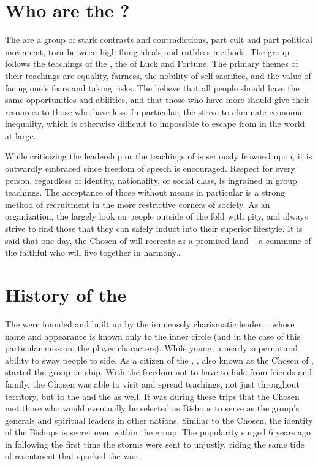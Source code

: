 \documentclass[blue]{GL2020}
\begin{document}
\name{\bCult{}}

\section*{Who are the \pGoaties{}?}
The \pGoaties{} are a group of stark contrasts and contradictions, part cult and part political movement, torn between high-flung ideals and ruthless methods. The group follows the teachings of the \cGenesis{\Deity} \cGenesis{}, the \cGenesis{\Deity} of Luck and Fortune. The primary themes of their teachings are equality, fairness, the nobility of self-sacrifice, and the value of facing one’s fears and taking risks. The \pGoaties{} believe that all people should have the same opportunities and abilities, and that those who have more should give their resources to those who have less. In particular, the \pGoaties{} strive to eliminate economic inequality, which is otherwise difficult to impossible to escape from in the world at large.

While criticizing the leadership or the teachings of \cGenesis{} is seriously frowned upon, it is outwardly embraced since freedom of speech is encouraged. Respect for every person, regardless of identity, nationality, or social class, is ingrained in group teachings. The acceptance of those without means in particular is a strong method of recruitment in the more restrictive corners of society. As an organization, the \pGoaties{} largely look on people outside of the fold with pity, and always strive to find those that they can safely induct into their superior lifestyle. It is said that one day, the Chosen of \cGenesis{} will recreate \pEarth{} as a promised land -- a commune of the faithful who will live together in harmony\ldots{}

\section*{History of the \pGoaties{}}
The \pGoaties{} were founded and built up by the immensely charismatic leader, \cChupLeader{\full}, whose name and appearance is known only to the inner circle (and in the case of this particular mission, the player characters). While young, \cChupLeader{\they} \cChupLeader{\have} a nearly supernatural ability to sway people to \cChupLeader{\their} side. As a citizen of the \pShip{}, \cChupLeader{}, also known as the Chosen of \cGenesis{}, started the group on \cChupLeader{\their} ship. With the freedom not to have to hide from friends and family, the Chosen was able to visit and spread \cChupLeader{\their} teachings, not just throughout \pShip{} territory, but to the \pTech{} and the \pFarm{} as well. It was during these trips that the Chosen met those who would eventually be selected as Bishops to serve as the group’s generals and spiritual leaders in other nations. Similar to the Chosen, the identity of the Bishops is secret even within the group. The \pGoaties{} popularity surged 6 years ago in \pShip{} following the first time the storms were sent to \pShip{} unjustly, riding the same tide of resentment that sparked the war.
\end{document}
